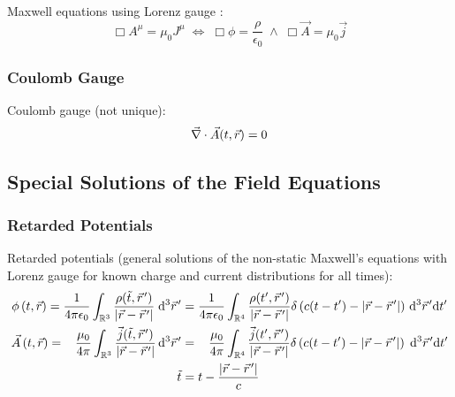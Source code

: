 			\noindent
			Maxwell equations using Lorenz gauge :
			\begin{equation}
				\Box A^\mu = \mu_0 J^\mu \;\Leftrightarrow\;
				\Box \phi = \dfrac{\rho}{\epsilon_0} \;\wedge\;
				\Box \vec{A} = \mu_0 \vec{j}
			\end{equation}

		\subsubsection{Coulomb Gauge }
			\noindent
			Coulomb gauge (not unique):
			\begin{equation}
				\vec{\nabla}\cdot\vec{A}(t,\vec{r})=0
			\end{equation}

	\subsection{Special Solutions of the Field Equations}
		\subsubsection{Retarded Potentials}
			\label{Sec:RetardedPotentials}
			\noindent
			Retarded potentials (general solutions of the non-static Maxwell's equations with Lorenz gauge for known charge and current distributions for all times):
			\begin{equation}
				\begin{aligned}
					\phi\left(t,\vec{r}\right)
					= \frac{1}{4\pi\epsilon_0} \int_{\mathbb{R}^3} \frac{\rho(\tilde{t},\pvec{r}')}{\left|\vec{r}-\pvec{r}'\right|}\;\dd^3 \pvec{r}'
					&=	\frac{1}{4\pi\epsilon_0} \int_{\mathbb{R}^4} \frac{\rho(t',\pvec{r}')}{\left|\vec{r}-\pvec{r}'\right|}\delta\left( c(t-t')-\left|\vec{r}-\pvec{r}'\right|\right)\,\dd^3 \pvec{r}'\dd t' \\
					\vec{A}\left(t,\vec{r}\right)
					= \phantom{\epsilon_0} \frac{\mu_0}{4\pi} \int_{\mathbb{R}^3} \frac{\vec{j}(\tilde{t},\pvec{r}')}{\left|\vec{r}-\pvec{r}'\right|}\,\dd^3 \pvec{r}'
					&=	\phantom{\epsilon_0} \frac{\mu_0}{4\pi} \int_{\mathbb{R}^4} \frac{\vec{j}(t',\pvec{r}')}{\left|\vec{r}-\pvec{r}'\right|}\delta\left( c(t-t')-\left|\vec{r}-\pvec{r}'\right|\right)\;\dd^3 \pvec{r}'\dd t' \\
					\tilde{t}&=t-\frac{\left|\vec{r}-\pvec{r}'\right|}{c}
				\end{aligned}
			\end{equation}

